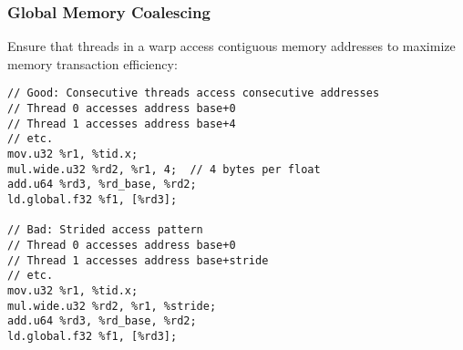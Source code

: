 \subsubsection{Global Memory Coalescing}

Ensure that threads in a warp access contiguous memory addresses to maximize memory transaction efficiency:

\begin{lstlisting}[style=ptx]
// Good: Consecutive threads access consecutive addresses
// Thread 0 accesses address base+0
// Thread 1 accesses address base+4
// etc.
mov.u32 %r1, %tid.x;
mul.wide.u32 %rd2, %r1, 4;  // 4 bytes per float
add.u64 %rd3, %rd_base, %rd2;
ld.global.f32 %f1, [%rd3];

// Bad: Strided access pattern
// Thread 0 accesses address base+0
// Thread 1 accesses address base+stride
// etc.
mov.u32 %r1, %tid.x;
mul.wide.u32 %rd2, %r1, %stride;
add.u64 %rd3, %rd_base, %rd2;
ld.global.f32 %f1, [%rd3];
\end{lstlisting}

